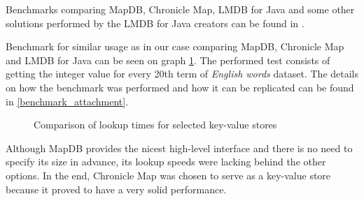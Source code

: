 Benchmarks comparing MapDB, Chronicle Map, LMDB for Java and some other solutions performed by the LMDB for Java creators
can be found in \citep{lmdb}.

Benchmark for similar usage as in our case comparing MapDB, Chronicle Map and LMDB for Java can be seen on graph \ref{comp_maps}.
The performed test consists of getting the integer value for every 20th term of \textit{English words} dataset.
The details on how the benchmark was performed and how it can be replicated can be found in \ref{benchmark_attachment}.

\begin{figure}[htbp]
    \centering
    \caption{Comparison of lookup times for selected key-value stores}
    \label{comp_maps}
\end{figure}

Although MapDB provides the nicest high-level interface and there is no need to specify its size in advance,
its lookup speeds were lacking behind the other options.
In the end, Chronicle Map was chosen to serve as a key-value store because it proved to have a very solid performance.

